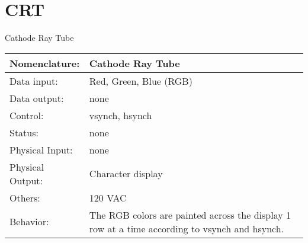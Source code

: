                             \section{CRT}
                            \label{page:crt}
                            \begin{buildingblock}{Cathode Ray Tube}
                                \begin{tabular}{|l|p{3.5in}|} \hline
                                    Nomenclature:  & Cathode Ray Tube  \\ \hline
                                    Data input:    & Red, Green, Blue (RGB)   \\ \hline
                                    Data output:   & none     \\ \hline
                                    Control:       & vsynch, hsynch     \\ \hline
                                    Status:        & none      \\ \hline
                                    Physical Input:& none        \\ \hline
                                    Physical Output:& Character display    \\ \hline
                                    Others:        & 120 VAC     \\ \hline
                                    Behavior:      & The RGB colors are painted across the display 1 row
                                    at a time according to vsynch and hsynch. \\ \hline
                                \end{tabular}
                            \end{buildingblock}

